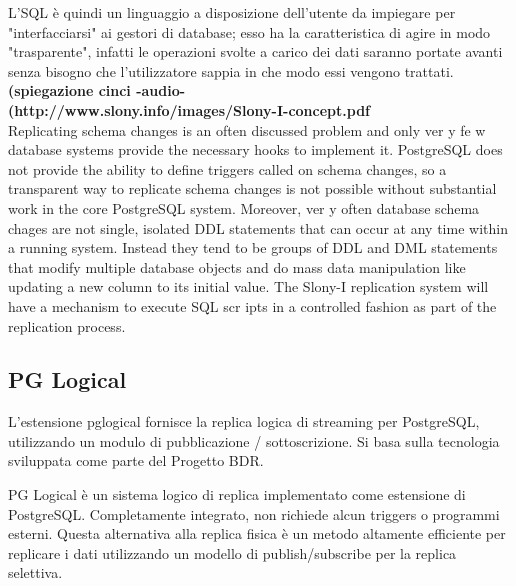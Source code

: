 L'SQL è quindi un linguaggio a disposizione dell'utente da impiegare per "interfacciarsi" ai gestori di database; esso ha la caratteristica di agire in modo "trasparente", infatti le operazioni svolte a carico dei dati saranno portate avanti senza bisogno che l'utilizzatore sappia in che modo essi vengono trattati.\\
\textbf{(spiegazione cinci -audio-}\\
\textbf{(http://www.slony.info/images/Slony-I-concept.pdf}\\
Replicating schema changes is an often discussed problem and only ver y
fe w database systems provide the necessary hooks to implement it. PostgreSQL
does not provide the ability to define triggers called on schema changes, so a
transparent way to replicate schema changes is not possible without substantial
work in the core PostgreSQL system.
Moreover, ver y often database schema chages are not single, isolated DDL
statements that can occur at any time within a running system. Instead they tend
to be groups of DDL and DML statements that modify multiple database objects
and do mass data manipulation like updating a new column to its initial value.
The Slony-I replication system will have a mechanism to execute SQL
scr ipts in a controlled fashion as part of the replication process.

\item
\subsection{PG Logical}
L'estensione pglogical fornisce la replica logica di streaming per PostgreSQL, utilizzando un modulo di pubblicazione / sottoscrizione. Si basa sulla tecnologia sviluppata come parte del Progetto BDR.


PG Logical \`e un sistema logico di replica implementato come estensione di PostgreSQL. Completamente integrato, non richiede alcun triggers o programmi esterni. Questa alternativa alla replica fisica \`e un metodo altamente efficiente per replicare i dati utilizzando un modello di publish/subscribe per la replica selettiva.

